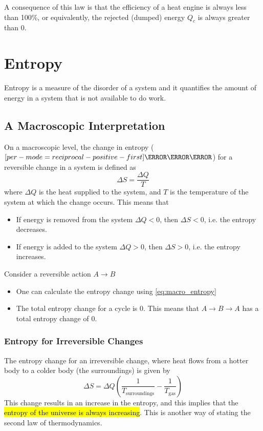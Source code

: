 \documentclass[a4paper,12pt]{article}
\let\oldsection\section
\renewcommand\section{\clearpage\oldsection}
\let\oldsi\si
\renewcommand{\si}[1]{\oldsi[per-mode=reciprocal-positive-first]{#1}}
\begin{document}
A consequence of this law is that the efficiency of a heat engine is always less than 100\%, or equivalently, the rejected (dumped) energy $Q_c$ is always greater than 0.

\section{Entropy}

Entropy is a measure of the disorder of a system and it quantifies the amount of energy in a system that is not available to do work.

\subsection{A Macroscopic Interpretation}

On a macroscopic level, the change in entropy ($\si{\joule\per\kelvin}$) for a reversible change in a system is defined as
\begin{equation}\label{eq:macro_entropy}
  \Delta S = \dfrac{\Delta Q}{T}
\end{equation}
where $\Delta Q$ is the heat supplied to the system, and $T$ is the temperature of the system at which the change occurs. This means that
\begin{itemize}
  \item If energy is removed from the system $\Delta Q < 0$, then $\Delta S < 0$, i.e. the entropy decreases.
  \item If energy is added to the system $\Delta Q > 0$, then $\Delta S > 0$, i.e. the entropy increases.
\end{itemize}
Consider a reversible action $A \rightarrow B$
\begin{itemize}
  \item One can calculate the entropy change using \cref{eq:macro_entropy}
  \item The total entropy change for a cycle is 0. This means that $A\rightarrow B \rightarrow A$ has a total entropy change of 0.
\end{itemize}

\pagebreak

\subsubsection{Entropy for Irreversible Changes}

The entropy change for an irreversible change, where heat flows from a hotter body to a colder body (the surroundings) is given by
\begin{equation}\label{eq:irreversible}
  \Delta S =\Delta Q\left(\frac{1}{T_\text{surroundings}} - \frac{1}{T_\text{gas}}\right)
\end{equation}
This change results in an increase in the entropy, and this implies that the \hl{entropy of the universe is always increasing}. This is another way of stating the second law of thermodynamics.
\end{document}
